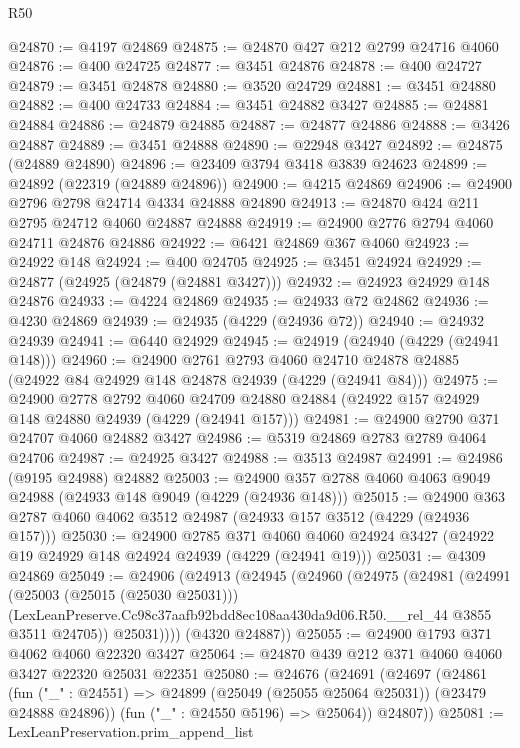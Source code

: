 \begin{lexlean}{R50}
\begin{coremodule}
@24870 := @4197 @24869
@24875 := @24870 @427 @212 @2799 @24716 @4060
@24876 := @400 @24725
@24877 := @3451 @24876
@24878 := @400 @24727
@24879 := @3451 @24878
@24880 := @3520 @24729
@24881 := @3451 @24880
@24882 := @400 @24733
@24884 := @3451 @24882 @3427
@24885 := @24881 @24884
@24886 := @24879 @24885
@24887 := @24877 @24886
@24888 := @3426 @24887
@24889 := @3451 @24888
@24890 := @22948 @3427
@24892 := @24875 (@24889 @24890)
@24896 := @23409 @3794 @3418 @3839 @24623
@24899 := @24892 (@22319 (@24889 @24896))
@24900 := @4215 @24869
@24906 := @24900 @2796 @2798 @24714 @4334 @24888 @24890
@24913 := @24870 @424 @211 @2795 @24712 @4060 @24887 @24888
@24919 := @24900 @2776 @2794 @4060 @24711 @24876 @24886
@24922 := @6421 @24869 @367 @4060
@24923 := @24922 @148
@24924 := @400 @24705
@24925 := @3451 @24924
@24929 := @24877 (@24925 (@24879 (@24881 @3427)))
@24932 := @24923 @24929 @148 @24876
@24933 := @4224 @24869
@24935 := @24933 @72 @24862
@24936 := @4230 @24869
@24939 := @24935 (@4229 (@24936 @72))
@24940 := @24932 @24939
@24941 := @6440 @24929
@24945 := @24919 (@24940 (@4229 (@24941 @148)))
@24960 := @24900
    @2761
    @2793
    @4060
    @24710
    @24878
    @24885
    (@24922 @84 @24929 @148 @24878 @24939 (@4229 (@24941 @84)))
@24975 := @24900
    @2778
    @2792
    @4060
    @24709
    @24880
    @24884
    (@24922 @157 @24929 @148 @24880 @24939 (@4229 (@24941 @157)))
@24981 := @24900 @2790 @371 @24707 @4060 @24882 @3427
@24986 := @5319 @24869 @2783 @2789 @4064 @24706
@24987 := @24925 @3427
@24988 := @3513 @24987
@24991 := @24986 (@9195 @24988) @24882
@25003 := @24900 @357 @2788 @4060 @4063 @9049 @24988 (@24933 @148 @9049 (@4229 (@24936 @148)))
@25015 := @24900 @363 @2787 @4060 @4062 @3512 @24987 (@24933 @157 @3512 (@4229 (@24936 @157)))
@25030 := @24900
    @2785
    @371
    @4060
    @4060
    @24924
    @3427
    (@24922 @19 @24929 @148 @24924 @24939 (@4229 (@24941 @19)))
@25031 := @4309 @24869
@25049 := @24906
    (@24913
      (@24945
        (@24960
          (@24975
            (@24981
              (@24991
                (@25003 (@25015 (@25030 @25031)))
                (LexLeanPreserve.Cc98c37aafb92bdd8ec108aa430da9d06.R50.__rel_44 @3855 @3511 @24705))
              @25031))))
      (@4320 @24887))
@25055 := @24900 @1793 @371 @4062 @4060 @22320 @3427
@25064 := @24870 @439 @212 @371 @4060 @4060 @3427 @22320 @25031 @22351
@25080 := @24676
    (@24691
      (@24697
        (@24861
          (fun ("_" : @24551) => @24899 (@25049 (@25055 @25064 @25031)) (@23479 @24888 @24896))
          (fun ("_" : @24550 @5196) => @25064))
        @24807))
@25081 := LexLeanPreservation.prim_append_list

\end{coremodule}
\end{lexlean}
